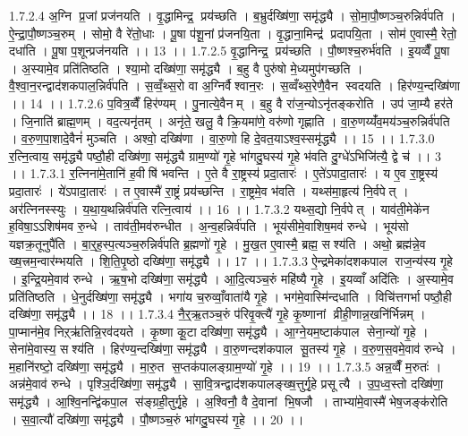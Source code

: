 1.7.2.4
अ॒ग्नि प्र॒जां प्रज॑नयति । वृ॒द्धामिन्द्र॒ प्रय॑च्छति । ब॒भ्रुर्दख्षि॑णा॒ समृ॑द्ध्यै । सो॒मा॒पौ॒ष्णञ्च॒रुन्निर्व॑पति । ऐ॒न्द्रा॒पौ॒ष्णञ्च॒रुम् । सोमो॒ वै रे॑तो॒धाः । पू॒षा प॑शू॒नां प्र॑जनयि॒ता । वृ॒द्धाना॒मिन्द्र॑ प्रदापयि॒ता । सोम॑ ए॒वास्मै॒ रेतो॒ दधा॑ति । पू॒षा प॒शून्प्रज॑नयति ।। 13 ।।
1.7.2.5
वृ॒द्धानिन्द्र॒ प्रय॑च्छति । पौ॒ष्णश्च॒रुर्भ॑वति । इ॒यव्वैँ पू॒षा । अ॒स्यामे॒व प्रति॑तिष्ठति । श्या॒मो दख्षि॑णा॒ समृ॑द्ध्यै । ब॒हु वै पुरु॑षो मे॒ध्यमुप॑गच्छति । वै॒श्वा॒न॒रन्द्वाद॑शकपाल॒न्निर्व॑पति । स॒व्वँ॒थ्स॒रो वा अ॒ग्निर्वैश्वान॒रः । स॒व्वँथ्स॒रेणै॒वैन॑ स्वदयति । हिर॑ण्य॒न्दख्षि॑णा ।। 14 ।।
1.7.2.6
प॒वित्र॒व्वैँ हिर॑ण्यम् । पु॒नात्ये॒वैनम् । ब॒हु वै रा॑ज॒न्योऽनृ॑तङ्करोति । उप॑ जा॒म्यै हर॑ते । जि॒नाति॑ ब्राह्म॒णम् । वद॒त्यनृ॑तम् । अनृ॑ते॒ खलु॒ वै क्रि॒यमा॑णे॒ वरु॑णो गृह्णाति । वा॒रु॒णय्यँ॑व॒मय॑ञ्च॒रुन्निर्व॑पति । व॒रु॒ण॒पा॒शादे॒वैनं॑ मुञ्चति । अश्वो॒ दख्षि॑णा । वा॒रु॒णो हि दे॒वत॒याऽश्व॒स्समृ॑द्ध्यै ।। 15 ।।
1.7.3.0
र॒त्नि॒त्वाय॒ समृ॑द्ध्यै पष्ठौ॒ही दख्षि॑णा॒ समृ॑द्ध्यै ग्राम॒ण्यो॑ गृ॒हे भा॑गदु॒घस्य॑ गृ॒हे भ॑वति दु॒ग्धे॑ऽभिजि॑त्यै॒ द्वे च॑ ।। 3 ।।
1.7.3.1
र॒त्निना॑मे॒तानि॑ ह॒वीषि॑ भवन्ति । ए॒ते वै रा॒ष्ट्रस्य॑ प्रदा॒तारः॑ । ए॒ते॑ऽपादा॒तारः॑ । य ए॒व रा॒ष्ट्रस्य॑ प्रदा॒तारः॑ । ये॑ऽपादा॒तारः॑ । त ए॒वास्मै॑ रा॒ष्ट्रं प्रय॑च्छन्ति । रा॒ष्ट्रमे॒व भ॑वति । यथ्स॑मा॒हृत्य॑ नि॒र्वपेत् । अर॑त्निनस्स्युः । य॒था॒य॒थन्निर्व॑पति रत्नि॒त्वाय॑ ।। 16 ।।
1.7.3.2
यथ्स॒द्यो नि॒र्वपेत् । याव॑ती॒मेके॑न ह॒विषा॒ऽऽशिष॑मव रु॒न्धे । ताव॑ती॒मव॑रुन्धीत । अ॒न्व॒हन्निर्व॑पति । भूय॑सीमे॒वाशिष॒मव॑ रुन्धे । भूय॑सो यज्ञक्र॒तूनुपै॑ति । बा॒र्॒ह॒स्प॒त्यञ्च॒रुन्निर्व॑पति ब्र॒ह्मणो॑ गृ॒हे । मु॒ख॒त ए॒वास्मै॒ ब्रह्म॒ सश्य॑ति । अथो॒ ब्रह्म॑न्ने॒व ख्ष॒त्त्रम॒न्वार॑म्भयति । शि॒ति॒पृ॒ष्ठो दख्षि॑णा॒ समृ॑द्ध्यै ।। 17 ।।
1.7.3.3
ऐ॒न्द्रमेका॑दशकपाल राज॒न्य॑स्य गृ॒हे । इ॒न्द्रि॒यमे॒वाव॑ रुन्धे । ऋ॒ष॒भो दख्षि॑णा॒ समृ॑द्ध्यै । आ॒दि॒त्यञ्च॒रुं महि॑ष्यै गृ॒हे । इ॒यव्वाँ अदि॑तिः । अ॒स्यामे॒व प्रति॑तिष्ठति । धे॒नुर्दख्षि॑णा॒ समृ॑द्ध्यै । भगा॑य च॒रुव्वाँ॒वाता॑यै गृ॒हे । भग॑मे॒वास्मि॑न्दधाति । विचि॑त्तगर्भा पष्ठौ॒ही दख्षि॑णा॒ समृ॑द्ध्यै ।। 18 ।।
1.7.3.4
नै॒र्॒ऋ॒तञ्च॒रुं प॑रिवृ॒क्त्यै॑ गृ॒हे कृ॒ष्णानां व्रीही॒णान्न॒खनि॑र्भिन्नम् । पा॒प्मान॑मे॒व निऱ्ऋ॑तिन्नि॒रव॑दयते । कृ॒ष्णा कू॒टा दख्षि॑णा॒ समृ॑द्ध्यै । आ॒ग्ने॒यम॒ष्टाक॑पाल सेना॒न्यो॑ गृ॒हे । सेना॑मे॒वास्य॒ सश्य॑ति । हिर॑ण्य॒न्दख्षि॑णा॒ समृ॑द्ध्यै । वा॒रु॒णन्दश॑कपाल सू॒तस्य॑ गृ॒हे । व॒रु॒ण॒स॒वमे॒वाव॑ रुन्धे । म॒हानि॑रष्टो॒ दख्षि॑णा॒ समृ॑द्ध्यै । मा॒रु॒त स॒प्तक॑पालङ्ग्राम॒ण्यो॑ गृ॒हे ।। 19 ।।
1.7.3.5
अन्न॒व्वैँ म॒रुतः॑ । अन्न॑मे॒वाव॑ रुन्धे । पृश्ञि॒र्दख्षि॑णा॒ समृ॑द्ध्यै । सा॒वि॒त्रन्द्वाद॑शकपालङ्ख्ष॒त्तुर्गृ॒हे प्रसूत्यै । उ॒प॒ध्व॒स्तो दख्षि॑णा॒ समृ॑द्ध्यै । आ॒श्वि॒नन्द्वि॑कपा॒ल स॑ङ्ग्रही॒तुर्गृ॒हे । अ॒श्विनौ॒ वै दे॒वानां भि॒षजौ । ताभ्या॑मे॒वास्मै॑ भेष॒जङ्क॑रोति । स॒वा॒त्यौ॑ दख्षि॑णा॒ समृ॑द्ध्यै । पौ॒ष्णञ्च॒रुं भा॑गदु॒घस्य॑ गृ॒हे ।। 20 ।।
